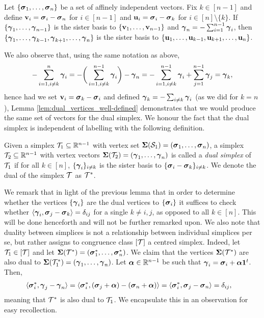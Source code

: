 \begin{lemma}
	\label{lem:dual_vertices_well-defined}
	Let $\{\vb*{\sigma}_1,\dots,\vb*{\sigma}_n\}$ be a set of affinely independent vectors. Fix $k\in [n-1]$ and define $\vb{v}_i=\vb*{\sigma}_i-\vb*{\sigma}_n$ for $i\in[n-1]$ and $\vb{u}_i=\vb*{\sigma}_i-\vb*{\sigma}_k$ for $i\in[n]\setminus\{k\}$. If $\{\vb*{\gamma}_1,\dots,\vb*{\gamma}_{n-1}\}$ is the sister basis to $\{\vb{v}_1,\dots,\vb{v}_{n-1}\}$ and $\vb*{\gamma}_n = -\sum_{i=1}^{n-1}\vb*{\gamma}_i$, then $\{\vb*{\gamma}_1,\dots,\vb*{\gamma}_{k-1},\vb*{\gamma}_{k+1},\dots,\vb*{\gamma}_{n}\}$ is the sister basis to $\{\vb{u}_1,\dots,\vb{u}_{k-1},\vb{u}_{k+1},\dots,\vb{u}_n\}$. 
\end{lemma}


We also observe that, using the same notation as above, 
\[-\sum_{i=1,i\neq k}^n \vb*{\gamma}_i = -\bigg(\sum_{i=1,i\neq k}^{n-1} \vb*{\gamma}_i\bigg) - \vb*{\gamma}_n = -\sum_{i=1,i\neq k}^{n-1}\vb*{\gamma}_i + \sum_{j=1}^{n-1} \vb*{\gamma}_j = \vb*{\gamma}_k,\]
hence had we set $\vb{v}_i=\vb*{\sigma}_k-\vb*{\sigma}_i$ and defined $\vb*{\gamma}_k = -\sum_{i\neq k}\vb*{\gamma}_i$ (as we did for $k=n$), Lemma \ref{lem:dual_vertices_well-defined} demonstrates that we would produce the same set of vectors for the dual simplex. We honour the fact that the dual simplex is independent of labelling with the following definition. 


\begin{definition}
\label{def:dual_simplex}
Given a simplex $\mathcal{T}_1\subseteq\mathbb{R}^{n-1}$ with vertex set $\boldsymbol{\Sigma}(\mathcal{S}_1)=(\vb*{\sigma}_1,\dots,\vb*{\sigma}_n)$, a simplex $\mathcal{T}_2\subseteq \mathbb{R}^{n-1}$ with vertex vectors $\boldsymbol{\Sigma}(\mathcal{T}_2)=(\vb*{\gamma}_1,\dots,\vb*{\gamma}_n)$ is called a \emph{dual simplex} of $\mathcal{T}_1$ if for all $k\in[n]$, $\{\vb*{\gamma}_i\}_{i\neq k}$ is the sister basis to $\{\vb*{\sigma}_i-\vb*{\sigma}_k\}_{i\neq k}$. We denote the dual of the simplex $\mathcal{T}$ as $\mathcal{T}^*$. 
\end{definition}

We remark that in light of the previous lemma that in order to determine whether the vertices $\{\vb*{\gamma}_i\}$ are the dual vertices to $\{\vb*{\sigma}_i\}$ it suffices to check whether $\langle \vb*{\gamma}_i,\vb*{\sigma}_j-\vb*{\sigma}_k\rangle=\delta_{ij}$ for a single $k\neq i,j$, as opposed to all $k\in[n]$. This will be done henceforth and will not be further remarked upon. 
We also note that duality between simplices is not a relationship between individual simplices per se, but rather assigns to congruence class $[\mathcal{T}]$ a centred simplex. Indeed, let $\mathcal{T}_1\in[\mathcal{T}]$
and  let $\boldsymbol{\Sigma}(\mathcal{T}^*)=(\vb*{\sigma}_1^*,\dots,\vb*{\sigma}_n^*)$. We claim that  the vertices $\boldsymbol{\Sigma}(\mathcal{T}^*)$ are also dual to $\boldsymbol{\Sigma}(\mathcal{T}_1^*)=(\vb*{\gamma}_1,\dots,\vb*{\gamma}_n)$. Let  $\vb*{\alpha}\in\mathbb{R}^{n-1}$  be such that $\vb*{\gamma}_i = \vb*{\sigma}_i + \vb*{\alpha}\vb{1}^t$. Then, 
\begin{align*}
\langle \vb*{\sigma}_i^*,\vb*{\gamma}_j-\vb*{\gamma}_n\rangle &= \langle \vb*{\sigma}_i^*,(\vb*{\sigma}_j+\vb*{\alpha}) - (\vb*{\sigma}_n+\vb*{\alpha})\rangle = \langle \vb*{\sigma}_i^*,\vb*{\sigma}_j-\vb*{\sigma}_n\rangle=\delta_{ij},
\end{align*}
meaning that $\mathcal{T}^*$ is also dual to $\mathcal{T}_1$. We encapsulate this in an observation for easy recollection. 

